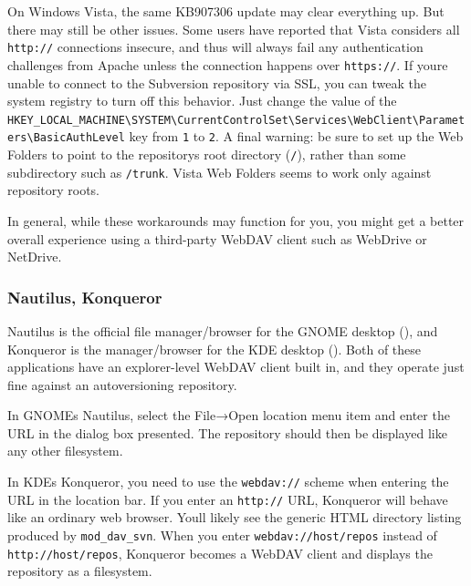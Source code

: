 On Windows Vista, the same KB907306 update may clear everything up. But
there may still be other issues. Some users have reported that Vista
considers all \texttt{http://} connections insecure, and thus will
always fail any authentication challenges from Apache unless the
connection happens over \texttt{https://}. If you\textquotesingle re
unable to connect to the Subversion repository via SSL, you can tweak
the system registry to turn off this behavior. Just change the value of
the
\texttt{HKEY\_LOCAL\_MACHINE\textbackslash{}SYSTEM\textbackslash{}CurrentControlSet\textbackslash{}Services\textbackslash{}WebClient\textbackslash{}Parameters\textbackslash{}BasicAuthLevel}
key from \texttt{1} to \texttt{2}. A final warning: be sure to set up
the Web Folders to point to the repository\textquotesingle s root
directory (\texttt{/}), rather than some subdirectory such as
\texttt{/trunk}. Vista Web Folders seems to work only against repository
roots.

In general, while these workarounds may function for you, you might get
a better overall experience using a third-party WebDAV client such as
WebDrive or NetDrive.

\subsubsection{Nautilus,
Konqueror}\label{svn.webdav.clients.file-explorer-extensions.linux-de}

Nautilus is the official file manager/browser for the GNOME desktop
(\href{https://www.gnome.org}{}), and Konqueror is the manager/browser
for the KDE desktop (\href{https://kde.org}{}). Both of these
applications have an explorer-level WebDAV client built in, and they
operate just fine against an autoversioning repository.

In GNOME\textquotesingle s Nautilus, select the File→Open location menu
item and enter the URL in the dialog box presented. The repository
should then be displayed like any other filesystem.

In KDE\textquotesingle s Konqueror, you need to use the
\texttt{webdav://} scheme when entering the URL in the location bar. If
you enter an \texttt{http://} URL, Konqueror will behave like an
ordinary web browser. You\textquotesingle ll likely see the generic HTML
directory listing produced by \texttt{mod\_dav\_svn}. When you enter
\texttt{webdav://host/repos} instead of \texttt{http://host/repos},
Konqueror becomes a WebDAV client and displays the repository as a
filesystem.

